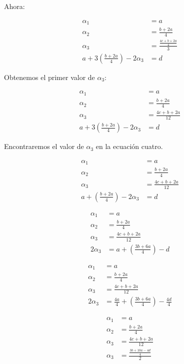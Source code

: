 \documentclass[letterpaper]{article}
\renewcommand{\*}{\cdot}
\theoremstyle{definition}
\begin{document}
	Ahora:
	\begin{center}
		\begin{align*}
		\alpha_{1}&=a\\
		\alpha_{2}&=\frac{b+2a}{4}\\
		\alpha_{3}&=\frac{\frac{4c+b+2a}{4}}{3}\\
		a+3\left( \frac{b+2a}{4} \right)-2\alpha_{3}&=d
		\end{align*}
	\end{center}
	Obtenemos el primer valor de $\alpha_{3}$: 
	\begin{center}
		\begin{align*}
		\alpha_{1}&=a\\
		\alpha_{2}&=\frac{b+2a}{4}\\
		\alpha_{3}&=\frac{4c+b+2a}{12}\\
		a+3\left( \frac{b+2a}{4} \right)-2\alpha_{3}&=d
		\end{align*}
	\end{center}
	Encontraremos el valor de $\alpha_{3}$ en la ecuación cuatro.
	\begin{center}
		\begin{align*}
		\alpha_{1}&=a\\
		\alpha_{2}&=\frac{b+2a}{4}\\
		\alpha_{3}&=\frac{4c+b+2a}{12}\\
		a+\left( \frac{b+2a}{4} \right)-2\alpha_{3}&=d
		\end{align*}
	\end{center}
	\begin{center}
		\begin{align*}
		\alpha_{1}&=a\\
		\alpha_{2}&=\frac{b+2a}{4}\\
		\alpha_{3}&=\frac{4c+b+2a}{12}\\
		2\alpha_{3}&=a+\left(\frac{3b+6a}{4}\right)-d
		\end{align*}
	\end{center}
	\begin{center}
		\begin{align*}
		\alpha_{1}&=a\\
		\alpha_{2}&=\frac{b+2a}{4}\\
		\alpha_{3}&=\frac{4c+b+2a}{12}\\
		2\alpha_{3}&=\frac{4a}{4}+\left(\frac{3b+6a}{4}\right)-\frac{4d}{4}
		\end{align*}
	\end{center}
	\begin{center}
		\begin{align*}
		\alpha_{1}&=a\\
		\alpha_{2}&=\frac{b+2a}{4}\\
		\alpha_{3}&=\frac{4c+b+2a}{12}\\
		\alpha_{3}&=\frac{\frac{3b+10a-4d}{4}}{2}
		\end{align*}
	\end{center}
\end{document}
